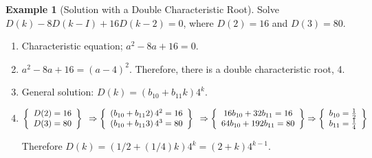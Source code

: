 \documentclass[10pt,]{book}
\theoremstyle{plain}
\theoremstyle{definition}
\theoremstyle{definition}
\theoremstyle{definition}
\newtheorem{example}[theorem]{Example}
\theoremstyle{definition}
\numberwithin{equation}{section}
\begin{document}
\begin{example}[Solution with a Double Characteristic Root]\label{ex-hrr-solution-example-3}
Solve \(D(k) - 8D(k - I) + 16D(k - 2) = 0\), where \(D(2) = 16\) and \(D(3) = 80\).%
\par
\leavevmode%
\begin{enumerate}[label=\alph*]
\item\hypertarget{li-46}{} Characteristic equation; \(a^2- 8a + 16 = 0\).%
\item\hypertarget{li-47}{}\(a^2- 8a + 16 = (a - 4)^2\). Therefore, there is a double characteristic root, 4.%
\item\hypertarget{li-48}{}General solution: \(D(k) = \left(b_{10}+b_{11}k\right)4^k\).%
\item\hypertarget{li-49}{}\(\left\{
\begin{array}{c}
 D(2)=16 \\
 D(3)=80 \\
\end{array}
\right\}\textrm{  }\Rightarrow \left\{
\begin{array}{c}
 \left(b_{10}+b_{11}2\right)4^2=16 \\
 \left(b_{10}+b_{11}3\right)4^3=80 \\
\end{array}
\right\}\textrm{  } \\ \Rightarrow \left\{
\begin{array}{c}
 16b_{10}+32b_{11}=16 \\
 64b_{10}+192b_{11}=80 \\
\end{array}
\right\} \Rightarrow  \left\{
\begin{array}{c}
 b_{10}=\frac{1}{2} \\
 b_{11}=\frac{1}{4} \\
\end{array}
\right\}\)
%
\par
Therefore \(D (k) = (1/2 + (1/4) k) 4^k= (2 + k)4^{k-1}\).
%
\end{enumerate}
%
\end{example}
\typeout{************************************************}
\typeout{************************************************}
\end{document}
